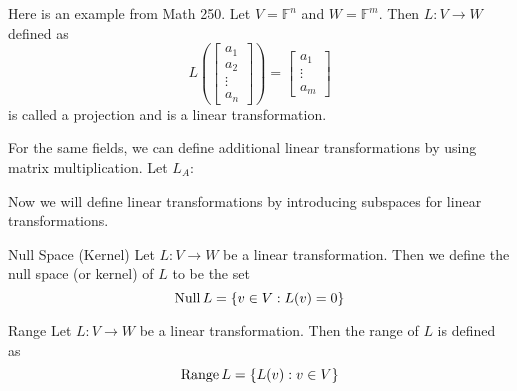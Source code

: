 \documentclass[main.tex]{subfiles}
\begin{document}
    \begin{example}{}{}
        Here is an example from Math 250. Let $V = \mathbb{F}^n$ and $W = \mathbb{F}^m$. Then $L: V\to W$ defined as 
        \begin{equation}
            L\left( \begin{bmatrix} a_1 \\ a_2 \\ \vdots \\ a_n \end{bmatrix} \right) = \begin{bmatrix} a_1 \\ \vdots \\ a_m \end{bmatrix}
        \end{equation}
        is called a projection and is a linear transformation. \bigbreak 

        For the same fields, we can define additional linear transformations by using matrix multiplication. Let $L_A: $
    \end{example}

    Now we will define linear transformations by introducing subspaces for linear transformations. 
    \begin{defn}{Null Space (Kernel)}{}
        Let $L: V\to W$ be a linear transformation. Then we define the null space (or kernel) of $L$ to be the set 
        \begin{equation}
            \operatorname{Null} L = \{ v\in V : L(v) = 0\}
        \end{equation}
    \end{defn}

    \begin{defn}{Range}{}
        Let $L: V\to W$ be a linear transformation. Then the range of $L$ is defined as 
        \begin{equation}
            \operatorname{Range} L = \{L(v) : v\in V\}
        \end{equation}
    \end{defn}
\end{document}
